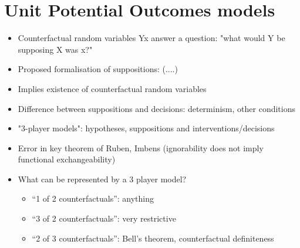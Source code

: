 \section{Unit Potential Outcomes models}

\begin{itemize}
    \item Counterfactual random variables Yx answer a question: "what would Y be supposing X was x?"
    \item Proposed formalisation of suppositions: (....)
    \item Implies existence of counterfactual random variables
    \item Difference between suppositions and decisions: determinism, other conditions
    \item "3-player models": hypotheses, suppositions and interventions/decisions
    \item Error in key theorem of Ruben, Imbens (ignorability does not imply functional exchangeability)
    \item What can be represented by a 3 player model?
    \begin{itemize}
        \item ``1 of 2 counterfactuals'': anything
        \item ``3 of 2 counterfactuals'': very restrictive
        \item ``2 of 3 counterfactuals'': Bell's theorem, counterfactual definiteness
    \end{itemize}
\end{itemize}




